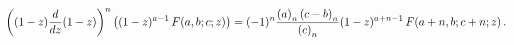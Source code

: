 \[\left((1-z)\frac{d}{dz}(1-z)\right)^{n}\left((1-z)^{a-1}\mathop{F\/}\nolimits%
\!\left(a,b;c;z\right)\right)=(-1)^{n}\frac{\left(a\right)_{n}\left(c-b\right)%
_{n}}{\left(c\right)_{n}}(1-z)^{a+n-1}\*\mathop{F\/}\nolimits\!\left(a+n,b;c+n%
;z\right).\]